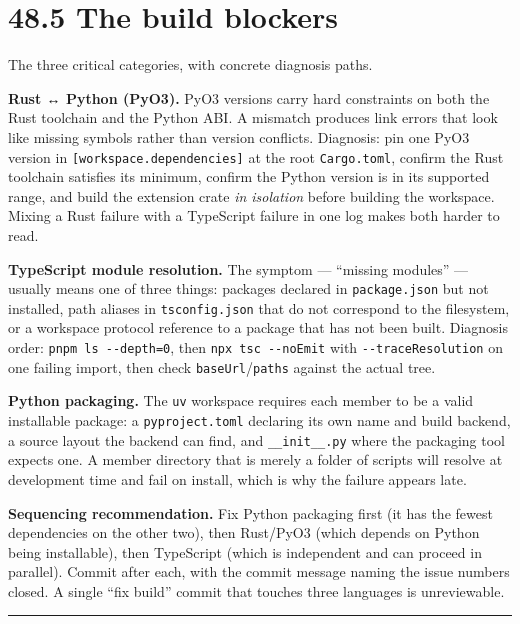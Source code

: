 \documentclass[
  11pt]{report}
\begin{document}
\hypertarget{the-build-blockers}{%
\section{48.5 The build blockers}\label{the-build-blockers}}

The three critical categories, with concrete diagnosis paths.

\textbf{Rust ↔ Python (PyO3).} PyO3 versions carry hard constraints on
both the Rust toolchain and the Python ABI. A mismatch produces link
errors that look like missing symbols rather than version conflicts.
Diagnosis: pin one PyO3 version in \texttt{{[}workspace.dependencies{]}}
at the root \texttt{Cargo.toml}, confirm the Rust toolchain satisfies
its minimum, confirm the Python version is in its supported range, and
build the extension crate \emph{in isolation} before building the
workspace. Mixing a Rust failure with a TypeScript failure in one log
makes both harder to read.

\textbf{TypeScript module resolution.} The symptom --- ``missing
modules'' --- usually means one of three things: packages declared in
\texttt{package.json} but not installed, path aliases in
\texttt{tsconfig.json} that do not correspond to the filesystem, or a
workspace protocol reference to a package that has not been built.
Diagnosis order: \texttt{pnpm\ ls\ -\/-depth=0}, then
\texttt{npx\ tsc\ -\/-noEmit} with \texttt{-\/-traceResolution} on one
failing import, then check \texttt{baseUrl}/\texttt{paths} against the
actual tree.

\textbf{Python packaging.} The \texttt{uv} workspace requires each
member to be a valid installable package: a \texttt{pyproject.toml}
declaring its own name and build backend, a source layout the backend
can find, and \texttt{\_\_init\_\_.py} where the packaging tool expects
one. A member directory that is merely a folder of scripts will resolve
at development time and fail on install, which is why the failure
appears late.

\textbf{Sequencing recommendation.} Fix Python packaging first (it has
the fewest dependencies on the other two), then Rust/PyO3 (which depends
on Python being installable), then TypeScript (which is independent and
can proceed in parallel). Commit after each, with the commit message
naming the issue numbers closed. A single ``fix build'' commit that
touches three languages is unreviewable.

\begin{center}\rule{0.5\linewidth}{0.5pt}\end{center}
\end{document}
